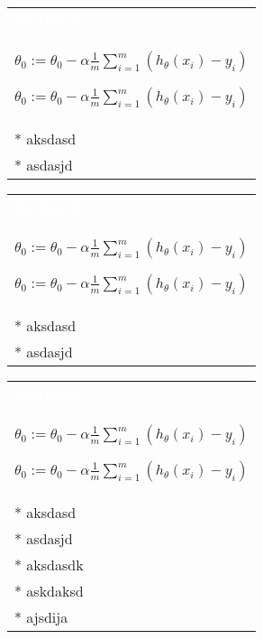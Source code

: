 \documentclass[a4paper,12pt,ngerman,fleqn]{article}
\newcommand{\mybox}[3]{
        \centering
        \begin{tabularx}{0.9\textwidth}{|X|}
            \rowcolor{accent}
            \rule{0pt}{20pt}
            \textcolor{white}{\textbf{#1}} \\
            \def\temp{#2}\ifx\temp\empty
                
            \else
                #2 \\ \hline
            \fi
            #3
            \\ \hline
        \end{tabularx}
    }
\begin{document}
    \begin{minipage}[t]{.51\textwidth}
        \vspace{1pt}
        \mybox
            {Section 4}
            {\( \theta_0 := \theta_0 - \alpha \frac{1}{m} \sum\limits_{i=1}^{m}(h_\theta(x_{i}) - y_{i}) \)}
            {
                * aksdasd \\
                * asdasjd
            }
        \newline
        \newline
        \newline
        \mybox
            {Section 5}
            {\( \theta_0 := \theta_0 - \alpha \frac{1}{m} \sum\limits_{i=1}^{m}(h_\theta(x_{i}) - y_{i}) \)}
            {
                * aksdasd \\
                * asdasjd
            }
        \newline
        \newline
        \newline
        \mybox
            {Section 6}
            {\( \theta_0 := \theta_0 - \alpha \frac{1}{m} \sum\limits_{i=1}^{m}(h_\theta(x_{i}) - y_{i}) \)}
            {
                * aksdasd \\
                * asdasjd \\
                * aksdasdk \\
                * askdaksd \\
                * ajsdija
            }
        \newline
    \end{minipage}
    
\end{document}
